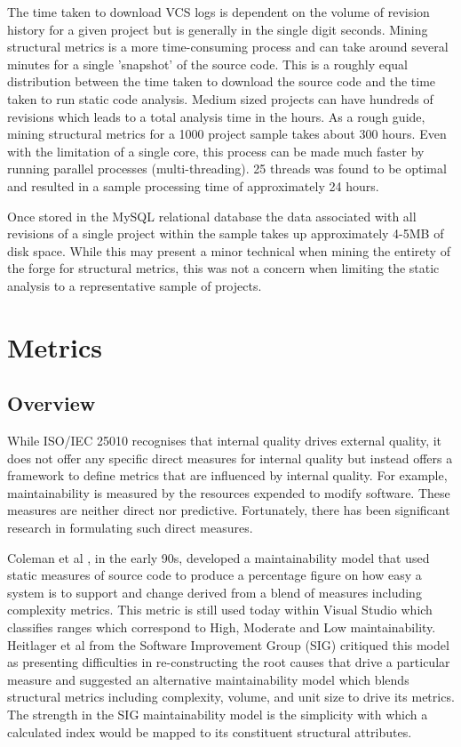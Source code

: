 The time taken to download VCS logs is dependent on the volume of revision history for a given project but is generally in the single digit seconds. Mining structural metrics is a more time-consuming process and can take around several minutes for a single 'snapshot' of the source code. This is a roughly equal distribution between the time taken to download the source code and the time taken to run static code analysis. Medium sized projects can have hundreds of revisions which leads to a total analysis time in the hours. As a rough guide, mining structural metrics for a 1000 project sample takes about 300 hours. Even with the limitation of a single core, this process can be made much faster by running parallel processes (multi-threading). 25 threads was found to be optimal and resulted in a sample processing time of approximately 24 hours.

Once stored in the MySQL relational database the data associated with all revisions of a single project within the sample takes up approximately 4-5MB of disk space. While this may present a minor technical when mining the entirety of the forge for structural metrics, this was not a concern when limiting the static analysis to a representative sample of projects.

\section{Metrics} %
\subsection{Overview}
While ISO/IEC 25010 recognises that internal quality drives external quality, it does not offer any specific direct measures for internal quality but instead offers a framework to define metrics that are influenced by internal quality. For example, maintainability is measured by the resources expended to modify software. These measures are neither direct nor predictive. Fortunately, there has been significant research in formulating such direct measures. 

Coleman et al \citep{coleman1994using}, in the early 90s, developed a maintainability model that used static measures of source code to produce a percentage figure on how easy  a system is to support and change derived from a blend of measures including complexity metrics. This metric is still used today within Visual Studio \citep{msdn2015code} which classifies ranges which correspond to High, Moderate and Low maintainability. Heitlager et al \citep{heitlager2007practical} from the Software Improvement Group (SIG) critiqued this model as presenting difficulties in re-constructing the root causes that drive a particular measure and suggested an alternative maintainability model which blends structural metrics including complexity, volume, and unit size to drive its metrics. The strength in the SIG maintainability model is the simplicity with which a calculated index would be mapped to its constituent structural attributes.

